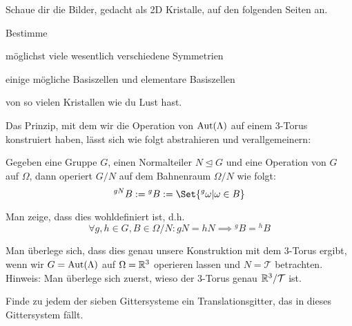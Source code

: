 \begin{sheet}

\begin{problem}
Schaue dir die Bilder, gedacht als 2D Kristalle, auf den folgenden Seiten an.

Bestimme
\begin{subproblem}
möglichst viele wesentlich verschiedene Symmetrien
\end{subproblem}

\begin{subproblem}
einige mögliche Basiszellen und elementare Basiszellen
\end{subproblem}

von so vielen Kristallen wie du Lust hast.
\end{problem}

\begin{problem}[difficulty={fortgeschritten}]
Das Prinzip, mit dem wir die Operation von $\operatorname{Aut}(\Lambda)$ auf einem 3-Torus konstruiert haben, lässt sich wie folgt abstrahieren und verallgemeinern:

Gegeben eine Gruppe $G$, einen Normalteiler $N\unlhd G$ und eine Operation von $G$ auf $\Omega$, dann operiert $G/N$ auf dem Bahnenraum $\Omega/N$ wie folgt:
\[{^{gN} B} := {^g B} := \Set{{^g \omega} | \omega\in B}\]
\begin{subproblem}[difficulty={einfach}]
Man zeige, dass dies wohldefiniert ist, d.h.
\[\forall g,h\in G, B\in\Omega/N: gN=hN \implies {^g B} = {^h B}\]
\end{subproblem}
\begin{subproblem}[difficulty={mittel}]
Man überlege sich, dass dies genau unsere Konstruktion mit dem 3-Torus ergibt, wenn wir $G=\operatorname{Aut}(\Lambda)$ auf $\Omega=\mathbb{R}^3$ operieren lassen und $N=\mathcal{T}$ betrachten. Hinweis: Man überlege sich zuerst, wieso der 3-Torus genau $\mathbb{R}^3 / \mathcal{T}$ ist.
\end{subproblem}
\end{problem}

\begin{problem}[difficulty={leicht bis mittel}]
Finde zu jedem der sieben Gittersysteme ein Translationsgitter, das in dieses Gittersystem fällt.
\end{problem}


\end{sheet}

